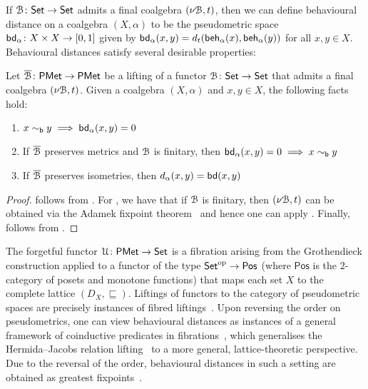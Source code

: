 If $\mathcal{B} \colon {\mathsf{Set}} \to {\mathsf{Set}}$ admits a final coalgebra $(\nu \mathcal{B}, t)$, then we can define behavioural distance on a  coalgebra $(X, \alpha)$ to be the pseudometric space $\bd_\alpha \colon X\times X \to \interval{0}{1}$ given by $\mathsf{bd}_\alpha(x,y) = d_{t}(\mathsf{beh}_{\alpha}(x), \mathsf{beh}_{\alpha}(y))$ for all $x, y \in X$. Behavioural distances satisfy several desirable properties:
\begin{lemma}\label{c2:lem:behavioural_distances_properties}
	Let $\overline{\mathcal{B}} \colon \mathsf{PMet} \to \mathsf{PMet}$ be a lifting of a functor $\mathcal{B} \colon {\mathsf{Set}} \to {\mathsf{Set}}$ that admits a final coalgebra $(\nu \mathcal{B}, t)$. Given a coalgebra $(X, \alpha)$ and $x,y \in X$, the following facts hold:
	\begin{enumerate}
		\item $x \sim_{\mathsf{b}} y \implies \mathsf{bd}_\alpha(x,y)=0$
		\item If $\overline{\mathcal{B}}$ preserves metrics and $\mathcal{B}$ is finitary, then $\mathsf{bd}_\alpha(x,y)=0 \implies x \sim_{\mathsf{b}} y$
		\item If $\overline{\mathcal{B}}$ preserves isometries, then $d_\alpha(x,y) = \mathsf{bd}(x,y)$
	\end{enumerate}
\end{lemma}
\begin{proof}
	 follows from \cite[Lemma~6.6]{Baldan:2018:Coalgebraic}. For , we have that if $\mathcal{B}$ is finitary, then $(\nu \mathcal{B},t)$ can be obtained via the Adamek fixpoint theorem~\cite{Adamek:1995:Greatest} and hence one can apply \cite[Theorem~6.10]{Baldan:2018:Coalgebraic}. Finally,  follows from \cite[Theorem~6.7]{Baldan:2018:Coalgebraic}.
\end{proof}
\begin{remark}
The forgetful functor $\mathcal{U} \colon \mathsf{PMet} \to {\mathsf{Set}}$ is a fibration arising from the Grothendieck construction applied to a functor of the type ${\mathsf{Set}}^{\text{op}} \to \mathsf{Pos}$ (where $\mathsf{Pos}$ is the $2$-category of posets and monotone functions) that maps each set $X$ to the complete lattice $(D_X, \sqsubseteq)$. Liftings of functors to the category of pseudometric spaces are precisely instances of fibred liftings~\cite{Angelo:2024:Behavioural}. Upon reversing the order on pseudometrics, one can view behavioural distances as instances of a general framework of coinductive predicates in fibrations~\cite{Hasuo:2018:Coinductive,Sprunger:2021:Fibrational}, which generalises the Hermida–Jacobs relation lifting~\cite{Hermida:1998:Structural} to a more general, lattice-theoretic perspective. Due to the reversal of the order, behavioural distances in such a setting are obtained as greatest fixpoints~\cite{Bonchi:2018:UpTo}.
\end{remark}
